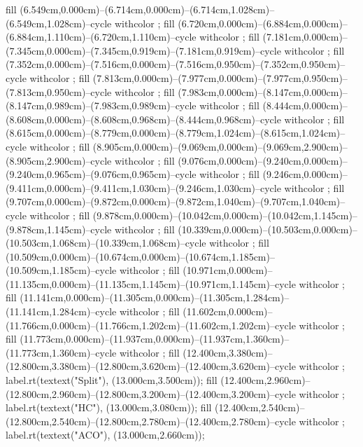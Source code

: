 {fill (6.549cm,0.000cm)--(6.714cm,0.000cm)--(6.714cm,1.028cm)--(6.549cm,1.028cm)--cycle withcolor ;
fill (6.720cm,0.000cm)--(6.884cm,0.000cm)--(6.884cm,1.110cm)--(6.720cm,1.110cm)--cycle withcolor ;
fill (7.181cm,0.000cm)--(7.345cm,0.000cm)--(7.345cm,0.919cm)--(7.181cm,0.919cm)--cycle withcolor ;
fill (7.352cm,0.000cm)--(7.516cm,0.000cm)--(7.516cm,0.950cm)--(7.352cm,0.950cm)--cycle withcolor ;
fill (7.813cm,0.000cm)--(7.977cm,0.000cm)--(7.977cm,0.950cm)--(7.813cm,0.950cm)--cycle withcolor ;
fill (7.983cm,0.000cm)--(8.147cm,0.000cm)--(8.147cm,0.989cm)--(7.983cm,0.989cm)--cycle withcolor ;
fill (8.444cm,0.000cm)--(8.608cm,0.000cm)--(8.608cm,0.968cm)--(8.444cm,0.968cm)--cycle withcolor ;
fill (8.615cm,0.000cm)--(8.779cm,0.000cm)--(8.779cm,1.024cm)--(8.615cm,1.024cm)--cycle withcolor ;
fill (8.905cm,0.000cm)--(9.069cm,0.000cm)--(9.069cm,2.900cm)--(8.905cm,2.900cm)--cycle withcolor ;
fill (9.076cm,0.000cm)--(9.240cm,0.000cm)--(9.240cm,0.965cm)--(9.076cm,0.965cm)--cycle withcolor ;
fill (9.246cm,0.000cm)--(9.411cm,0.000cm)--(9.411cm,1.030cm)--(9.246cm,1.030cm)--cycle withcolor ;
fill (9.707cm,0.000cm)--(9.872cm,0.000cm)--(9.872cm,1.040cm)--(9.707cm,1.040cm)--cycle withcolor ;
fill (9.878cm,0.000cm)--(10.042cm,0.000cm)--(10.042cm,1.145cm)--(9.878cm,1.145cm)--cycle withcolor ;
fill (10.339cm,0.000cm)--(10.503cm,0.000cm)--(10.503cm,1.068cm)--(10.339cm,1.068cm)--cycle withcolor ;
fill (10.509cm,0.000cm)--(10.674cm,0.000cm)--(10.674cm,1.185cm)--(10.509cm,1.185cm)--cycle withcolor ;
fill (10.971cm,0.000cm)--(11.135cm,0.000cm)--(11.135cm,1.145cm)--(10.971cm,1.145cm)--cycle withcolor ;
fill (11.141cm,0.000cm)--(11.305cm,0.000cm)--(11.305cm,1.284cm)--(11.141cm,1.284cm)--cycle withcolor ;
fill (11.602cm,0.000cm)--(11.766cm,0.000cm)--(11.766cm,1.202cm)--(11.602cm,1.202cm)--cycle withcolor ;
fill (11.773cm,0.000cm)--(11.937cm,0.000cm)--(11.937cm,1.360cm)--(11.773cm,1.360cm)--cycle withcolor ;
fill (12.400cm,3.380cm)--(12.800cm,3.380cm)--(12.800cm,3.620cm)--(12.400cm,3.620cm)--cycle withcolor ;
label.rt(textext("\tfx Split"), (13.000cm,3.500cm));
fill (12.400cm,2.960cm)--(12.800cm,2.960cm)--(12.800cm,3.200cm)--(12.400cm,3.200cm)--cycle withcolor ;
label.rt(textext("\tfx HC"), (13.000cm,3.080cm));
fill (12.400cm,2.540cm)--(12.800cm,2.540cm)--(12.800cm,2.780cm)--(12.400cm,2.780cm)--cycle withcolor ;
label.rt(textext("\tfx ACO"), (13.000cm,2.660cm));
\stopMPcode}

\stopsection
\stopchapter
